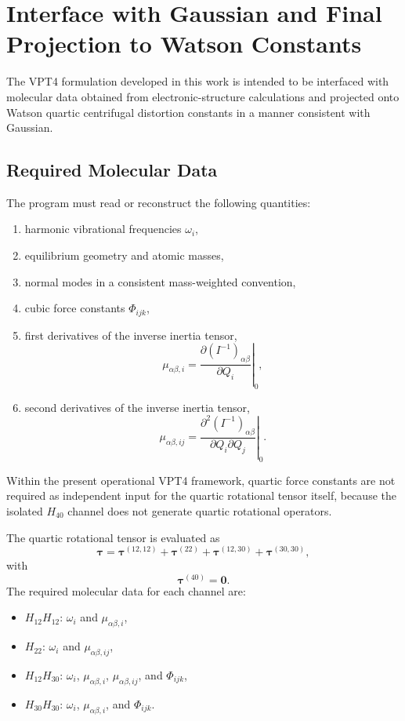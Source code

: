 \documentclass[aip,jcp,reprint]{revtex4-2}
\begin{document}
\section{Interface with Gaussian and Final Projection to Watson Constants}
The VPT4 formulation developed in this work is intended to be interfaced
with molecular data obtained from electronic-structure calculations and
projected onto Watson quartic centrifugal distortion constants in a manner
consistent with Gaussian.\cite{Franke2021,Gaw1991}

\subsection{Required Molecular Data}
The program must read or reconstruct the following quantities:
\begin{enumerate}
\item harmonic vibrational frequencies $\omega_i$,
\item equilibrium geometry and atomic masses,
\item normal modes in a consistent mass-weighted convention,
\item cubic force constants $\Phi_{ijk}$,
\item first derivatives of the inverse inertia tensor,
\[
\mu_{\alpha\beta,i}
=
\left.
\frac{\partial (I^{-1})_{\alpha\beta}}{\partial Q_i}
\right|_0,
\]
\item second derivatives of the inverse inertia tensor,
\[
\mu_{\alpha\beta,ij}
=
\left.
\frac{\partial^2 (I^{-1})_{\alpha\beta}}{\partial Q_i \partial Q_j}
\right|_0.
\]
\end{enumerate}

Within the present operational VPT4 framework, quartic force constants are not required as independent input for the quartic rotational tensor itself, because the isolated $H_{40}$ channel does not generate quartic rotational operators.

The quartic rotational tensor is evaluated as
\[
\bm{\tau}
=
\bm{\tau}^{(12,12)}
+
\bm{\tau}^{(22)}
+
\bm{\tau}^{(12,30)}
+
\bm{\tau}^{(30,30)},
\]
with
\[
\bm{\tau}^{(40)} = \bm{0}.
\]
The required molecular data for each channel are:
\begin{itemize}
\item $H_{12}H_{12}$: $\omega_i$ and $\mu_{\alpha\beta,i}$,
\item $H_{22}$: $\omega_i$ and $\mu_{\alpha\beta,ij}$,
\item $H_{12}H_{30}$: $\omega_i$, $\mu_{\alpha\beta,i}$, $\mu_{\alpha\beta,ij}$, and $\Phi_{ijk}$,
\item $H_{30}H_{30}$: $\omega_i$, $\mu_{\alpha\beta,i}$, and $\Phi_{ijk}$.
\end{itemize}
\end{document}
